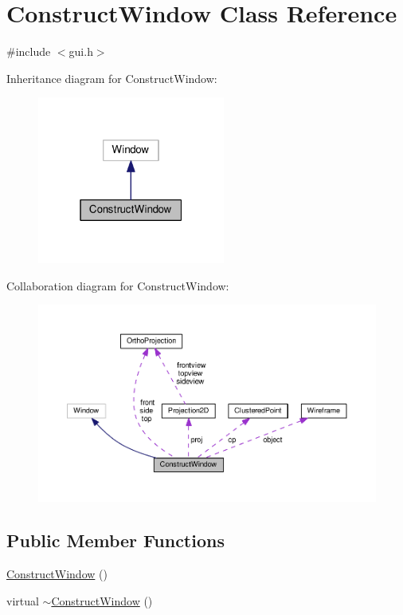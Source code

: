 \hypertarget{class_construct_window}{}\section{Construct\+Window Class Reference}
\label{class_construct_window}


{\ttfamily \#include $<$gui.\+h$>$}



Inheritance diagram for Construct\+Window\+:\nopagebreak
\begin{figure}[H]
\begin{center}
\leavevmode
\includegraphics[width=175pt]{class_construct_window__inherit__graph}
\end{center}
\end{figure}


Collaboration diagram for Construct\+Window\+:\nopagebreak
\begin{figure}[H]
\begin{center}
\leavevmode
\includegraphics[width=350pt]{class_construct_window__coll__graph}
\end{center}
\end{figure}
\subsection*{Public Member Functions}
\begin{DoxyCompactItemize}
\item 
\hyperlink{class_construct_window_afbb85abe7e7a42cc8efb29dbac587646}{Construct\+Window} ()
\item 
virtual \hyperlink{class_construct_window_a5182d4b2d3fbdb1b9b8fa54bdfb8036c}{$\sim$\+Construct\+Window} ()
\end{DoxyCompactItemize}
